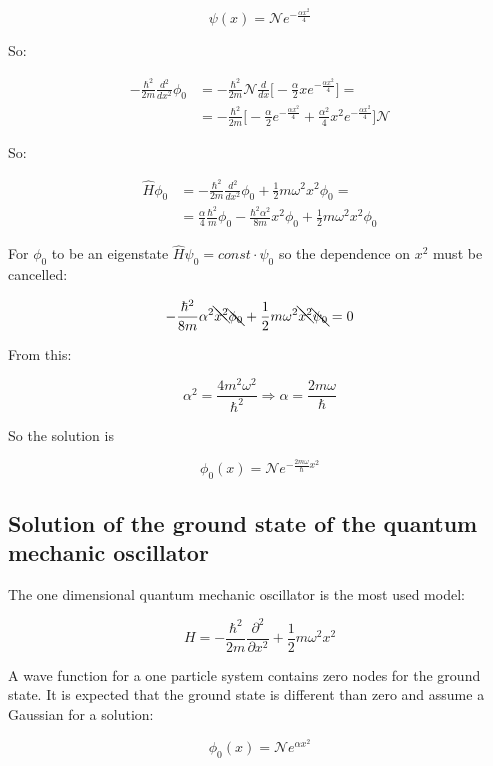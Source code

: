   $$\psi(x) = \mathcal{N}e^{-\frac{\alpha x^2}{4}}$$

  So:

  \begin{align*}
    -\frac{\hbar^2}{2m}\frac{d{^2}}{d{x^2}}\phi_0 &= -\frac{\hbar^2}{2m}\mathcal{N}\frac{d{}}{d{x}}\biggl[-\frac{\alpha}{2}xe^{-\frac{\alpha x^2}{4}}\biggr]=\\
                                                  &= -\frac{\hbar^2}{2m}\biggl[-\frac{\alpha}{2}e^{-\frac{\alpha x^2}{4}}+\frac{\alpha^2}{4}x^2e^{-\frac{\alpha x^2}{4}}\biggr]\mathcal{N}
  \end{align*}

  So:

  \begin{align*}
    \hat{H}\phi_0 &= -\frac{\hbar^2}{2m}\frac{d{^2}}{d{x^2}}\phi_0 + \frac{1}{2}m\omega^2x^2\phi_0=\\
                  &= \frac{\alpha}{4}\frac{\hbar^2}{m}\phi_0 -\frac{\hbar^2\alpha^2}{8m}x^2\phi_0 + \frac{1}{2}m\omega^2x^2\phi_0
  \end{align*}

  For $\phi_0$ to be an eigenstate $\hat{H}\psi_0 = const\cdot\psi_0$ so the dependence on $x^2$ must be cancelled:

  $$-\frac{\hbar^2}{8m}\alpha^2\bcancel{x^2}\bcancel{\phi_0} + \frac{1}{2}m\omega^2\bcancel{x^2}\bcancel{\psi_0} = 0$$

  From this:

  $$\alpha^2 = \frac{4m^2\omega^2}{\hbar^2}\Rightarrow\alpha=\frac{2m\omega}{\hbar}$$

  So the solution is

  $$\phi_0(x) = \mathcal{N}e^{-\frac{2m\omega}{\hbar}x^2}$$

  \subsection{Solution of the ground state of the quantum mechanic oscillator}
  The one dimensional quantum mechanic oscillator is the most used model:

  $$H = -\frac{\hbar^2}{2m}\frac{\partial^2}{\partial x^2} + \frac{1}{2}m\omega^2x^2$$

  A wave function for a one particle system contains zero nodes for the ground state.
  It is expected that the ground state is different than zero and assume a Gaussian for a solution:

  $$\phi_0(x) = \mathcal{N} e^{\alpha x^2}$$

